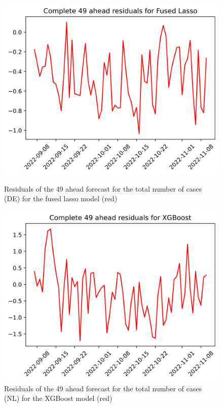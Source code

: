 \begin{figure}

\begin{minipage}{.32\textwidth}
  \centering
  \includegraphics[width=\linewidth]{pics/49_ah/DE_49_ahead_errors_Fused Lasso.png}
  \caption{Residuals of the 49 ahead forecast for the total number of cases (DE) for the fused lasso model (red)}
  \label{fig:tot_cases_error_49_flasso_DE}
\end{minipage}
\begin{minipage}{.32\textwidth}
  \centering
  \includegraphics[width=\linewidth]{pics/49_ah/49_ahead_errors_XGBoost.png}
  \caption{Residuals of the 49 ahead forecast for the total number of cases (NL) for the XGBoost model (red)}

\end{minipage}
\end{figure}
